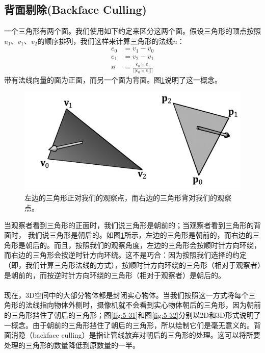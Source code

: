 \documentclass[11pt,a4paper,oldfontcommands]{memoir}
\begin{document}
{\subsection{背面剔除(Backface Culling)}
\begin{flushleft}
一个三角形有两个面。我们使用如下约定来区分这两个面。假设三角形的顶点按照$v_{0}$、$v_{1}$、$v_{2}$的顺序排列，我们这样来计算三角形的法线$n$：
\begin{align*}
e_{0}&=v_{1}-v_{0}\\
e_{1}&=v_{2}-v_{1}\\
n&=\frac{e_{0}\times e_{1}}{||e_{0}\times e_{1}||}
\end{align*}
带有法线向量的面为正面，而另一个面为背面。图\ref{fig:5-30}说明了这一概念。
\begin{figure}[h]
    \includegraphics[width=\textwidth]{5-30}
    \centering
    \caption{左边的三角形正对我们的观察点，而右边的三角形背对我们的观察点。}
    \label{fig:5-30}
\end{figure}
当观察者看到三角形的正面时，我们说三角形是朝前的；当观察者看到三角形的背面时， 我们说三角形是朝后的。如图\ref{fig:5-30}所示，左边的三角形是朝前的，而右边的三角形是朝后的。而且，按照我们的观察角度，左边的三角形会按顺时针方向环绕，而右边的三角形会按逆时针方向环绕。这不是巧合：因为按照我们选择的约定（即，我们计算三角形法线的方式），按顺时针方向环绕的三角形（相对于观察者）是朝前的，而按逆时针方向环绕的三角形（相对于观察者）是朝后的。\\
~\\
现在，3D空间中的大部分物体都是封闭实心物体。当我们按照这一方式将每个三角形的法线指向物体外侧时，摄像机就不会看到实心物体朝后的三角形，因为朝前的三角形挡住了朝后的三角形；图\ref{fig:5-31}和图\ref{fig:5-32}分别以2D和3D形式说明了一概念。由于朝前的三角形挡住了朝后的三角形，所以绘制它们是毫无意义的。背面消隐（backface culling）是指让管线放弃对朝后的三角形的处理。这可以将所要处理的三角形的数量降低到原数量的一半。
\end{flushleft}
}
\end{document}
